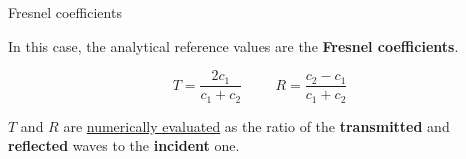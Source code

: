 \begin{frame}{Fresnel coefficients}
    \small

    In this case, the analytical reference values are the \textcolor{BrickRed}{\textbf{Fresnel coefficients}}.

    \normalsize

    \begin{equation*}
        T=\frac{2c_1}{c_1+c_2} \hspace{1cm} R=\frac{c_2-c_1}{c_1+c_2}
    \end{equation*}

    \small

    \vfill

    \pause

    $T$ and $R$ are \underline{numerically evaluated} as the ratio of the \textbf{transmitted} and \textbf{reflected} waves to the \textbf{incident} one.

    \vfill

    \normalsize

\end{frame}
